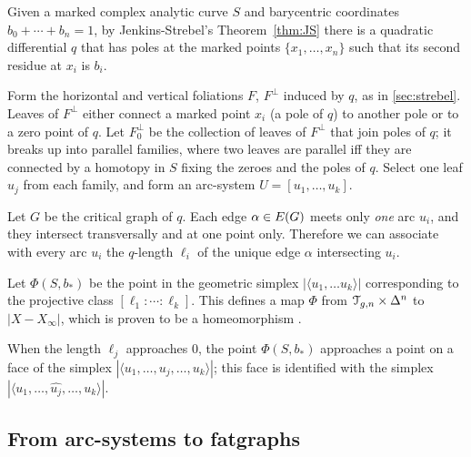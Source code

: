 Given a marked complex analytic curve $S$ and barycentric coordinates
$b_0 + \cdots + b_n = 1$, by Jenkins-Strebel's Theorem~\ref{thm:JS} there is a
quadratic differential $q$ that has poles at the marked points $\{ x_1,
\ldots, x_n \}$ such that its second residue at $x_i$ is $b_i$.

Form the horizontal and vertical foliations $F$, $F^\perp$ induced by $q$,
as in \ref{sec:strebel}.  Leaves of $F^\perp$ either connect a marked
point $x_i$ (a pole of $q$) to another pole or to a zero point of $q$.
Let $F^\perp_0$ be the collection of leaves of $F^\perp$ that join poles of
$q$; it breaks up into parallel families, where two leaves are
parallel iff they are connected by a homotopy in $S$ fixing the zeroes
and the poles of $q$.  Select one leaf $u_j$ from each family, and
form an arc-system $U = [u_1, \ldots, u_k]$.

Let $G$ be the critical graph of $q$.  Each edge $\alpha \in E(G)$ meets
only \emph{one} arc $u_i$, and they intersect transversally and at one
point only.  Therefore we can associate with every arc $u_i$ the
$q$-length $\ell_i$ of the unique edge $\alpha$ intersecting $u_i$.  

Let $\Phi(S, b_*)$ be the point in the geometric simplex $|\langle u_1, \ldots
u_k\rangle|$ corresponding to the projective class $[\ell_1:\cdots:\ell_k]$.  This
defines a map $\Phi$ from $\mathcal{T}_{g,n} \times \Delta^n$ to $|X - X_\infty|$, which is
proven to be a homeomorphism \cite{harer;cohomological-dimension,
  looijenga;cellular-decomposition}.

\begin{remark}
  \label{rem:approaching-face}
  When the length $\ell_j$ approaches $0$, the point $\Phi(S, b_*)$
  approaches a point on a face of the simplex $|\langle u_1, \ldots,
  u_j, \ldots, u_k\rangle|$; this face is identified with the simplex
  $|\langle u_1, \ldots, \widehat{u_j}, \ldots, u_k\rangle|$.
\end{remark}


\subsection{From arc-systems to fatgraphs}
\label{sec:arcs-to-rg}

